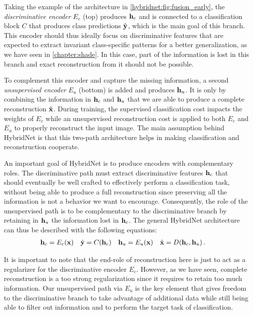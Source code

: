 Taking the example of the architecture in \autoref{hybridnet:fig:fusion_early}, the \textit{discriminative encoder} $E_c$ (top) produces $\mathbf{h}_c$ and is connected to a classification block $C$ that produces class predictions $\hat{\mathbf{y}}$, which is the main goal of this branch. This encoder should thus ideally focus on discriminative features that are expected to extract invariant class-specific patterns for a better generalization, as we have seen in \autoref{chapter:shade}. In this case, part of the information is lost in this branch and exact reconstruction from it should not be possible.

To complement this encoder and capture the missing information, a second \textit{unsupervised encoder} $E_u$ (bottom) is added and produces $\mathbf{h}_u$. It is only by combining the information in $\mathbf{h}_c$ and $\mathbf{h}_u$ that we are able to produce a complete reconstruction $\hat{\mathbf{x}}$.
%
During training, the supervised classification cost impacts the weights of $E_c$ while an unsupervised reconstruction cost is applied to both $E_c$ and $E_u$ to properly reconstruct the input image. The main assumption behind HybridNet is that this two-path architecture helps in making classification and reconstruction cooperate.

An important goal of HybridNet is to produce encoders with complementary roles. The discriminative path must extract discriminative features $\mathbf{h}_c$ that should eventually be well crafted to effectively perform a classification task, without being able to  produce a full reconstruction since preserving all the information is not a behavior we want to encourage. Consequently, the role of the unsupervised path is to be complementary to the discriminative branch by retaining in $\mathbf{h}_u$ the information lost in $\mathbf{h}_c$. The general HybridNet architecture can thus be described with the following equations:
\begin{align}\label{hybridnet:eq:general}
	\mathbf{h}_c &= E_c(\mathbf{x}) & \hat{\mathbf{y}} &= C(\mathbf{h}_c) & \mathbf{h}_u &= E_u(\mathbf{x}) & \hat{\mathbf{x}} &= D(\mathbf{h}_c, \mathbf{h}_u)\,.
\end{align}

It is important to note that the end-role of reconstruction here is just to act as a regularizer for the discriminative encoder $E_c$. However, as we have seen, complete reconstruction is a too strong regularization since it requires to retain too much information. Our unsupervised path via $E_u$ is the key element that gives freedom to the discriminative branch to take advantage of additional data while still being able to filter out information and to perform the target task of classification.

